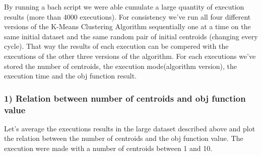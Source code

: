\documentclass[11pt]{article}
\begin{document}
By running a bach script we were able cumulate a large quantity of
execution results (more than 4000 executions). For consistency we've run
all four different versions of the K-Means Clustering Algorithm
sequentially one at a time on the same initial dataset and the same
random pair of initial centroids (changing every cycle). That way the
results of each execution can be compered with the executions of the
other three versions of the algorithm. For each executions we've stored
the number of centroids, the execution mode(algorithm version), the
execution time and the obj function result.

\hypertarget{relation-between-number-of-centroids-and-obj-function-value}{%
\subsubsection{1) Relation between number of centroids and obj function
value}\label{relation-between-number-of-centroids-and-obj-function-value}}

Let's average the executions results in the large dataset described
above and plot the relation between the number of centroids and the obj
function value. The execution were made with a number of centroids
between 1 and 10.
\end{document}
